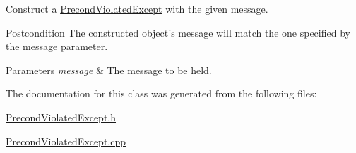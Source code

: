 Construct a \hyperlink{class_precond_violated_except}{Precond\-Violated\-Except} with the given message. 

\begin{DoxyPostcond}{Postcondition}
The constructed object's message will match the one specified by the message parameter. 
\end{DoxyPostcond}

\begin{DoxyParams}{Parameters}
{\em message} & The message to be held. \\
\hline
\end{DoxyParams}


The documentation for this class was generated from the following files\-:\begin{DoxyCompactItemize}
\item 
\hyperlink{_precond_violated_except_8h}{Precond\-Violated\-Except.\-h}\item 
\hyperlink{_precond_violated_except_8cpp}{Precond\-Violated\-Except.\-cpp}\end{DoxyCompactItemize}
